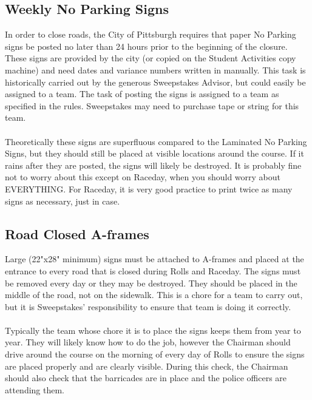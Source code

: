 \subsection{Weekly No Parking Signs}
In order to close roads, the City of Pittsburgh requires that paper No
Parking signs be posted no later than 24 hours prior to the beginning of the
closure. These signs are provided by the city (or copied on the Student
Activities copy machine) and need dates and variance numbers written in
manually. This task is historically carried out by the generous Sweepstakes
Advisor, but could easily be assigned to a team. The task of posting the signs
is assigned to a team as specified in the rules. Sweepstakes may need to
purchase tape or string for this team.
\\\\
Theoretically these signs are superfluous compared to the Laminated No
Parking Signs, but they should still be placed at visible locations around
the course. If it rains after they are posted, the signs will likely be
destroyed. It is probably fine not to worry about this except on Raceday,
when you should worry about EVERYTHING. For Raceday, it is very good practice
to print twice as many signs as necessary, just in case.

\subsection{Road Closed A-frames}
Large (22"x28" minimum) signs must be attached to A-frames and placed
at the entrance to every road that is closed during Rolls and Raceday. The
signs must be removed every day or they may be destroyed. They should be
placed in the middle of the road, not on the sidewalk. This is a chore for a
team to carry out, but it is Sweepstakes' responsibility to ensure that team
is doing it correctly.
\\\\
Typically the team whose chore it is to place the signs keeps them from
year to year. They will likely know how to do the job, however the Chairman
should drive around the course on the morning of every day of Rolls to ensure
the signs are placed properly and are clearly visible. During this check,
the Chairman should also check that the barricades are in place and the police
officers are attending them.

